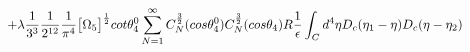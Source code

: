\begin{equation}
\hspace{0.5in}
+\lambda\frac{1}{3^3}\frac{1}{2^{12}}\frac{1}{\pi^4}\big{[}\Omega_5\big{]}^{\frac{1}{2}}cot{\theta_4^0}\sum_{N=1}^{\infty}C_N^{\frac{3}{2}}(cos{\theta_4^0})C_N^{\frac{3}{2}}(cos{\theta_4})R\frac{1}{\epsilon}\int_Cd^4\eta D_c(\eta_1 - \eta)D_c(\eta - \eta_2)
\end{equation}

